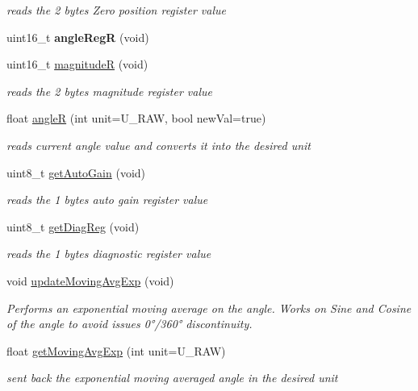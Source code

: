 \begin{DoxyCompactItemize}
\begin{DoxyCompactList}\small\item\em reads the 2 bytes Zero position register value \end{DoxyCompactList}\item 
\mbox{\label{classAMS__AS5048B_a4b356e895fbcddf68eeffaa020b27420}} 
uint16\+\_\+t {\bfseries angle\+RegR} (void)
\item 
uint16\+\_\+t \hyperlink{classAMS__AS5048B_acd55346e4eedada7b86e43f42822ae2a}{magnitudeR} (void)
\begin{DoxyCompactList}\small\item\em reads the 2 bytes magnitude register value \end{DoxyCompactList}\item 
float \hyperlink{classAMS__AS5048B_a91b6f6054e75ed1eb43faa16edd38ec5}{angleR} (int unit=U\+\_\+\+R\+AW, bool new\+Val=true)
\begin{DoxyCompactList}\small\item\em reads current angle value and converts it into the desired unit \end{DoxyCompactList}\item 
uint8\+\_\+t \hyperlink{classAMS__AS5048B_a5be27698e144b1889f9df2f43ad85cc9}{get\+Auto\+Gain} (void)
\begin{DoxyCompactList}\small\item\em reads the 1 bytes auto gain register value \end{DoxyCompactList}\item 
uint8\+\_\+t \hyperlink{classAMS__AS5048B_ae2ebf1d3b0e9b9cf73fbf5ea22ada636}{get\+Diag\+Reg} (void)
\begin{DoxyCompactList}\small\item\em reads the 1 bytes diagnostic register value \end{DoxyCompactList}\item 
void \hyperlink{classAMS__AS5048B_a20a1cab67cc2ec87135366723893b1aa}{update\+Moving\+Avg\+Exp} (void)
\begin{DoxyCompactList}\small\item\em Performs an exponential moving average on the angle. Works on Sine and Cosine of the angle to avoid issues 0°/360° discontinuity. \end{DoxyCompactList}\item 
float \hyperlink{classAMS__AS5048B_a1d994be5aa856d1e2e033ba4f7ed65fc}{get\+Moving\+Avg\+Exp} (int unit=U\+\_\+\+R\+AW)
\begin{DoxyCompactList}\small\item\em sent back the exponential moving averaged angle in the desired unit \end{DoxyCompactList}\item 

\end{DoxyCompactItemize}
